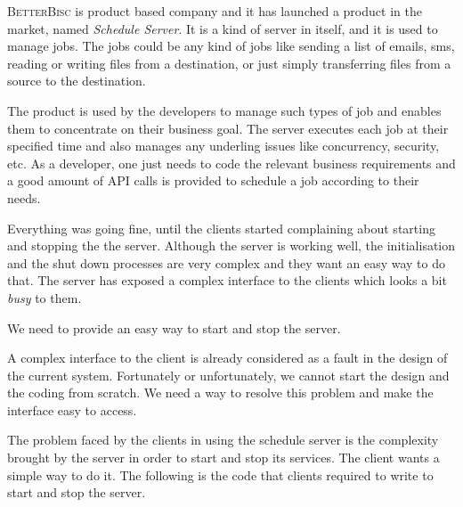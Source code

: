 \documentclass[12pt,a4paper]{exam}
\begin{document}
\begin{questions}
\question %
\textsc{BetterBisc} is product based company and it has launched a product in the market, 
named \emph{Schedule Server}. It is a kind of server in itself, and it is used to manage jobs. 
The jobs could be any kind of jobs like sending a list of emails, sms, reading or writing 
files from a destination, or just simply transferring files from a source to the destination. 

The product is used by the developers to manage such types of job and enables them to concentrate 
on their business goal. The server executes each job at their specified time and 
also manages any underling issues like concurrency, security, etc. As a developer, one just needs
to code the relevant business requirements and a good amount of API calls is 
provided to schedule a job according to their needs.

Everything was going fine, until the clients started complaining about starting and stopping the
the server. Although the server is working well, the initialisation and the shut down 
processes are very complex and they want an easy way to do that. 
The server has exposed a complex interface to the clients which looks a bit \emph{busy} 
to them.

We need to provide an easy way to start and stop the server.

A complex interface to the client is already considered as a fault in the design of the 
current system.  Fortunately or unfortunately, we cannot start the design and the coding
from scratch. We need a way to resolve this problem and make the interface easy to access.

The problem faced by the clients in using the schedule server is 
the complexity brought by the server in order to start and stop its services. 
The client wants a simple way to do it. The following is the code that clients 
required to write to start and stop the server.


\end{questions}
\end{document}
